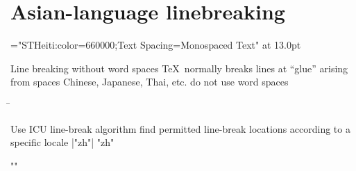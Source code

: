 \section{Asian-language linebreaking}


\font\simpchin="STHeiti:color=660000;Text Spacing=Monospaced Text" at 13.0pt
\item Line breaking without word spaces
\subitem \TeX\ normally breaks lines at “glue” arising from spaces
\subitem Chinese, Japanese, Thai, etc. do not use word spaces
\iffalse
\subitem {\rightskip0pt \hfuzz\maxdimen\thai โดยพื้นฐานแล้ว, คอมพิวเตอร์จะเกี่ยวข้องกับเรื่องของตัวเลข. คอมพิวเตอร์จัดเก็บตัวอักษรและอักขระอื่นๆ โดยการกำหนดหมายเลขให้สำหรับแต่ละตัว. ก่อนหน้าที่๊ Unicode จะถูกสร้างขึ้น, ได้มีระบบ encoding อยู่หลายร้อยระบบสำหรับการกำหนดหมายเลขเหล่านี้.\par}
\=
\item Use ICU line-break: |\XeTeXlinebreaklocale "th"|
\XeTeXlinebreaklocale "th"
\XeTeXlinebreakskip 0pt plus 2pt
\subitem {\rightskip0pt \thai โดยพื้นฐานแล้ว, คอมพิวเตอร์จะเกี่ยวข้องกับเรื่องของตัวเลข. คอมพิวเตอร์จัดเก็บตัวอักษรและอักขระอื่นๆ โดยการกำหนดหมายเลขให้สำหรับแต่ละตัว. ก่อนหน้าที่๊ Unicode จะถูกสร้างขึ้น, ได้มีระบบ encoding อยู่หลายร้อยระบบสำหรับการกำหนดหมายเลขเหล่านี้.\par}
\else
{}
\=
\item Use ICU line-break algorithm
\subitem find permitted line-break locations according to a specific locale
\subitem |\XeTeXlinebreaklocale "zh"|\vadjust{\vskip2pt}
\XeTeXlinebreaklocale "zh"
\hfil{}
\fi
\XeTeXlinebreaklocale ""


